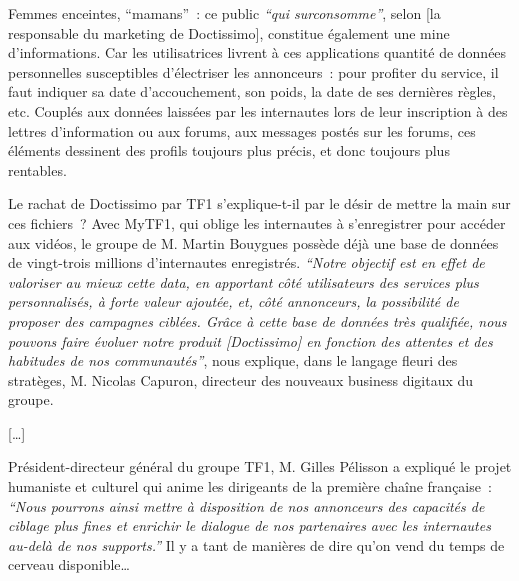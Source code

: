 \documentclass[11pt]{article}
\newcommand{\ellipse}{[…]\xspace}
\begin{document}
\begin{mdframed}[style=citationstyle]
Femmes enceintes, \enquote{mamans} : ce public \emph{\enquote{qui surconsomme}}, selon [la responsable du marketing de Doctissimo], constitue également une mine d'informations. Car les utilisatrices livrent à ces applications quantité de données personnelles susceptibles d'électriser les annonceurs : pour profiter du service, il faut indiquer sa date d'accouchement, son poids, la date de ses dernières règles, etc. Couplés aux données laissées par les internautes lors de leur inscription à des lettres d'information ou aux forums, aux messages postés sur les forums, ces éléments dessinent des profils toujours plus précis, et donc toujours plus rentables.

Le rachat de Doctissimo par TF1 s'explique-t-il par le désir de mettre la main sur ces fichiers ? Avec MyTF1, qui oblige les internautes à s'enregistrer pour accéder aux vidéos, le groupe de M. Martin Bouygues possède déjà une base de données de vingt-trois millions d'internautes enregistrés. \emph{\enquote{Notre objectif est en effet de valoriser au mieux cette data, en apportant côté utilisateurs des services plus personnalisés, à forte valeur ajoutée, et, côté annonceurs, la possibilité de proposer des campagnes ciblées. Grâce à cette base de données très qualifiée, nous pouvons faire évoluer notre produit [Doctissimo] en fonction des attentes et des habitudes de nos communautés}}, nous explique, dans le langage fleuri des stratèges, M. Nicolas Capuron, directeur des nouveaux business digitaux du groupe.

\ellipse

Président-directeur général du groupe TF1, M. Gilles Pélisson a expliqué le projet humaniste et culturel qui anime les dirigeants de la première chaîne française : \emph{\enquote{Nous pourrons ainsi mettre à disposition de nos annonceurs des capacités de ciblage plus fines et enrichir le dialogue de nos partenaires avec les internautes au-delà de nos supports.}} Il y a tant de manières de dire qu'on vend du temps de cerveau disponible…
\end{mdframed}
\end{document}

